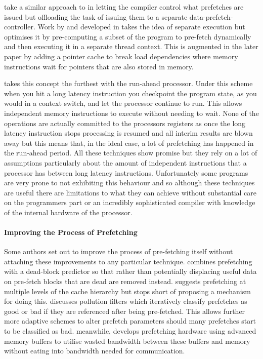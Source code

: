 \citet{vanderwielCompilerassistedDataPrefetch1999} take a similar approach to \citeauthor{veidenbaumDecoupledAccessDRAM1997} in letting the compiler control what prefetches are issued but offloading the task of issuing them to a separate data-prefetch-controller. Work by \citet{collinsDynamicSpeculativePrecomputation2001} and developed in \citeyear{collinsPointerCacheAssisted2002}\cite{collinsPointerCacheAssisted2002} takes the idea of separate execution but optimises it by pre-computing a subset of the program to pre-fetch dynamically and then executing it in a separate thread context. This is augmented in the later paper by adding a pointer cache to break load dependencies where memory instructions wait for pointers that are also stored in memory. 

\citet{mutluRunaheadExecutionAlternative2003, mutluRunaheadExecutionEffective2003} takes this concept the furthest with the run-ahead processor. Under this scheme when you hit a long latency instruction you checkpoint the program state, as you would in a context switch, and let the processor continue to run. This allows independent memory instructions to execute without needing to wait. None of the operations are actually committed to the processors registers as once the long latency instruction stops processing is resumed and all interim results are blown away but this means that, in the ideal case, a lot of prefetching has happened in the run-ahead period. All these techniques show promise but they rely on a lot of assumptions particularly about the amount of independent instructions that a processor has between long latency instructions. Unfortunately some programs are very prone to not exhibiting this behaviour and so although these techniques are useful there are limitations to what they can achieve without substantial care on the programmers part or an incredibly sophisticated compiler with knowledge of the internal hardware of the processor.

\paragraph{Improving the Process of Prefetching}

Some authors set out to improve the process of pre-fetching itself without attaching these improvements to any particular technique. \citet{laiDeadblockPredictionDeadblock2001} combines prefetching with a dead-block predictor so that rather than potentially displacing useful data on pre-fetch blocks that are dead are removed instead. \citet{frittsMultilevelMemoryPrefetching2002} suggests prefetching at multiple levels of the cache hierarchy but stops short of proposing a mechanism for doing this. \citet{zhuangHardwarebasedCachePollution2003} discusses pollution filters which iteratively classify prefetches as good or bad if they are referenced after being pre-fetched. This allows further more adaptive schemes to alter prefetch parameters should many prefetches start to be classified as bad. \citet{linDRAMLevelPrefetchingFullyBuffered2007} meanwhile, develops prefetching hardware using advanced memory buffers to utilise wasted bandwidth between these buffers and memory without eating into bandwidth needed for communication. 

